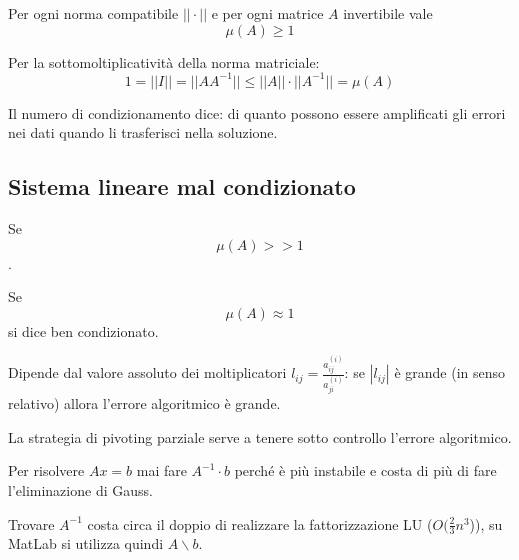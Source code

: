 \documentclass[12pt,a4paper,]{report}
\begin{document}
\begin{teorema}
    \label{th: mu maggiore uguale 1}
    Per ogni norma compatibile $||\cdot||$ e per ogni matrice $A$ invertibile vale
    \[
        \mu(A) \geq 1
    \]
\end{teorema}
\begin{dimostrazione}
    Per la sottomoltiplicatività della norma matriciale:
    \[
        1 = ||I|| = ||A A^{-1}|| \leq ||A|| \cdot ||A^{-1}|| = \mu(A)
    \]
\end{dimostrazione}
\begin{nota}
    Il numero di condizionamento dice: di quanto possono essere amplificati gli errori nei dati quando li trasferisci nella soluzione.
\end{nota}
\subsection{Sistema lineare mal condizionato}
\begin{definizione}
    Se $$\mu(A)>>1$$.
\end{definizione}
\begin{definizione}
    Se $$\mu(A)\approx 1$$ si dice ben condizionato.
\end{definizione}

\begin{lezione}
    [Lezione 10 05/04]
\end{lezione}
\begin{definizione}
    Dipende dal valore assoluto dei moltiplicatori
    $
    l_{ij} = \frac{a_{ij}^{(i)}}{a_{ji}^{(i)}}
    $:
    se $|l_{ij}|$ è grande (in senso relativo) allora l'errore algoritmico è grande.
\end{definizione}
\begin{nota}
    La strategia di pivoting parziale serve a tenere sotto controllo l'errore algoritmico.
\end{nota}
\begin{teorema}
    Per risolvere $Ax=b$ mai fare $A^{-1}\cdot b$ perché è più instabile e costa di più di fare l'eliminazione di Gauss.
\end{teorema}
\begin{nota}
    Trovare $A^{-1}$ costa circa il doppio di realizzare la fattorizzazione LU ($O(\frac{2}{3}n^3$)), su MatLab si utilizza quindi $A \backslash b$.
\end{nota}
\end{document}
